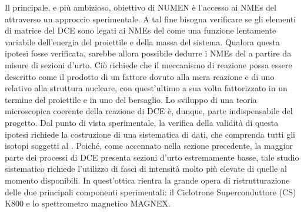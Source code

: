 Il principale, e più ambizioso, obiettivo di NUMEN è l'accesso ai NMEs del \doppiobeta{} attraverso un approccio sperimentale. A tal fine bisogna verificare se gli elementi di matrice del DCE sono legati ai NMEs del \doppiobeta{} come una funzione lentamente variabile dell'energia del proiettile e della massa del sistema.
Qualora questa ipotesi fosse verificata, sarebbe allora possibile dedurre i NMEs del \doppiobeta{} a partire da misure di sezioni d'urto.
Ciò richiede che il meccanismo di reazione possa essere descritto come il prodotto di un fattore dovuto alla mera reazione e di uno relativo alla struttura nucleare, con quest'ultimo a sua volta fattorizzato in un termine del proiettile e in uno del bersaglio.
Lo sviluppo di una teoria microscopica coerente della reazione di DCE è, dunque, parte indispensabile del progetto. 
Dal punto di vista sperimentale, la verifica della validità di questa ipotesi richiede la costruzione di una sistematica di dati, che comprenda tutti gli isotopi soggetti al \doppiobeta.
Poiché, come accennato nella sezione precedente, la maggior parte dei processi di DCE presenta sezioni d'urto estremamente basse, tale studio sistematico richiede l'utilizzo di fasci di intensità molto più elevate di quelle al momento disponibili.
In quest'ottica rientra la grande opera di ristrutturazione delle due principali componenti sperimentali: il Ciclotrone Superconduttore (CS) K800 e lo spettrometro magnetico MAGNEX.


